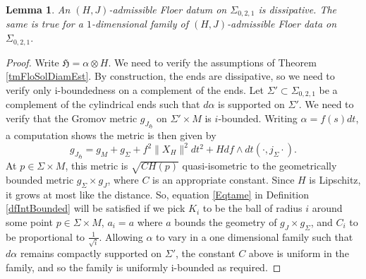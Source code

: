 \documentclass[11pt]{amsart}
\newtheorem{lm}[tm]{Lemma}
\theoremstyle{definition}
\theoremstyle{remark}
\begin{document}
\begin{lm}
An $(H,J)$-admissible Floer datum on $\Sigma_{0,2,1}$ is dissipative. The same is true for a $1$-dimensional family of $(H,J)$-admissible Floer data on $\Sigma_{0,2,1}.$
\end{lm}
\begin{proof}
Write $\mathfrak{H}=\alpha\otimes H$. We need to verify the assumptions of Theorem \ref{tmFloSolDiamEst}. By construction, the ends are dissipative, so we need to verify only i-boundedness on a complement of the ends. Let $\Sigma'\subset\Sigma_{0,2,1}$ be a complement of the cylindrical ends such that $d\alpha$ is supported on $\Sigma'.$ We need to verify that the Gromov metric $g_{J_{\mathfrak{H}}}$ on $\Sigma'\times M$ is $i$-bounded. Writing $\alpha=f(s)dt$, a computation shows the metric is then given by
\[
g_{J_{\mathfrak{H}}}=g_M+ g_\Sigma+f^2\|X_{H}\|^2dt^2+Hdf\wedge dt(\cdot,j_{\Sigma}\cdot).
\]
At $p\in\Sigma\times M$, this metric is $\sqrt{CH(p)}$ quasi-isometric to the geometrically bounded metric $g_\Sigma\times g_J$, where $C$ is an appropriate constant. Since $H$ is Lipschitz, it grows at most like the distance. So, equation \eqref{Eqtame} in Definition \ref{dfIntBounded} will be satisfied if we pick $K_i$ to be the ball of radius $i$ around some point $p\in\Sigma\times M$, $a_i=a$ where $a$ bounds the geometry of $g_J\times g_\Sigma$, and $C_i$ to be proportional to $\frac1{\sqrt{i}}$. Allowing $\alpha$ to vary in a one dimensional family such that $d\alpha$ remains compactly supported on $\Sigma'$, the constant $C$ above is uniform in the family, and so the family is uniformly i-bounded as required.
\end{proof}
\end{document}
